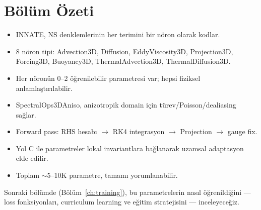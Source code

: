 \section{Bölüm Özeti}
\label{sec:mimari_ozet}

\begin{itemize}
    \item INNATE, NS denklemlerinin her terimini bir nöron olarak kodlar.
    \item 8 nöron tipi: Advection3D, Diffusion, EddyViscosity3D, Projection3D, Forcing3D, Buoyancy3D, ThermalAdvection3D, ThermalDiffusion3D.
    \item Her nöronün 0--2 öğrenilebilir parametresi var; hepsi fiziksel anlamlaştırılabilir.
    \item SpectralOps3DAniso, anizotropik domain için türev/Poisson/dealiasing sağlar.
    \item Forward pass: RHS hesabı $\to$ RK4 integrasyon $\to$ Projection $\to$ gauge fix.
    \item Yol C ile parametreler lokal invariantlara bağlanarak uzamsal adaptasyon elde edilir.
    \item Toplam $\sim$5--10K parametre, tamamı yorumlanabilir.
\end{itemize}

Sonraki bölümde (Bölüm~\ref{ch:training}), bu parametrelerin nasıl öğrenildiğini --- loss fonksiyonları, curriculum learning ve eğitim stratejisini --- inceleyeceğiz.
